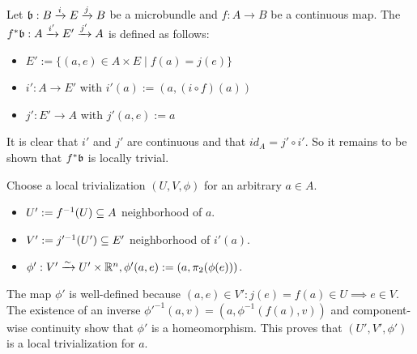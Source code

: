 \begin{mydefinition}
    Let $\bb: \bundle{B}{E}{i}{j}$ be a microbundle and $f: A \to B$ be a continuous map.
    The  $\bundledef{f^*\bb}{A}{E'}{i'}{j'}$ is defined as follows:
    \begin{itemize}
        \item $E' := \{ (a, e) \in A \times E \mid f(a) = j(e) \}$
        \item $i': A \to E'$ with $i'(a) := (a, (i \circ f)(a))$
        \item $j': E' \to A$ with $j'(a, e) := a$
    \end{itemize}
\end{mydefinition}
\begin{myproof}[$f^*\bb$ is a microbundle]
    It is clear that $i'$ and $j'$ are continuous and that $id_A = j' \circ i'$.
    So it remains to be shown that $f^*\bb$ is locally trivial.

    Choose a local trivialization $(U, V, \phi)$ for an arbitrary $a \in A$.
    \begin{itemize}
        \item $U' := f^{-1}(U) \sub A$ neighborhood of $a$.
        \item $V' := j'^{-1}(U') \sub E'$ neighborhood of $i'(a)$.
        \item $\phi': V' \isomto U' \times \R^n, \phi'(a, e) := (a, \pi_2(\phi(e)))$.
    \end{itemize}
    The map $\phi'$ is well-defined because $(a, e) \in V': j(e) = f(a) \in U \implies e \in V$.
    The existence of an inverse $\phi'^{-1}(a, v) = (a, \phi^{-1}(f(a), v))$ and component-wise continuity show that $\phi'$ is a homeomorphism.
    This proves that $(U', V', \phi')$ is a local trivialization for $a$. 
\end{myproof}